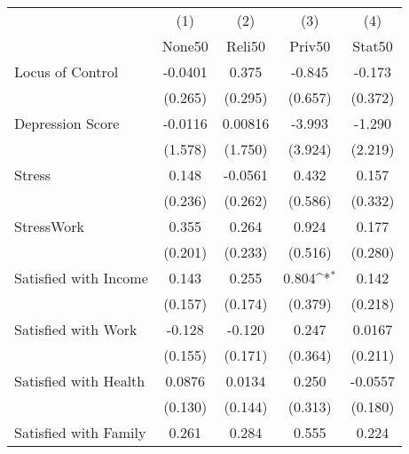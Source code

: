 {
\def\sym#1{\ifmmode^{#1}\else\(^{#1}\)\fi}
\begin{tabular}{l*{4}{c}}
\hline\hline
            &\multicolumn{1}{c}{(1)}&\multicolumn{1}{c}{(2)}&\multicolumn{1}{c}{(3)}&\multicolumn{1}{c}{(4)}\\
            &\multicolumn{1}{c}{None50}&\multicolumn{1}{c}{Reli50}&\multicolumn{1}{c}{Priv50}&\multicolumn{1}{c}{Stat50}\\
\hline
Locus of Control&     -0.0401         &       0.375         &      -0.845         &      -0.173         \\
            &     (0.265)         &     (0.295)         &     (0.657)         &     (0.372)         \\
[1em]
Depression Score&     -0.0116         &     0.00816         &      -3.993         &      -1.290         \\
            &     (1.578)         &     (1.750)         &     (3.924)         &     (2.219)         \\
[1em]
Stress      &       0.148         &     -0.0561         &       0.432         &       0.157         \\
            &     (0.236)         &     (0.262)         &     (0.586)         &     (0.332)         \\
[1em]
StressWork  &       0.355         &       0.264         &       0.924         &       0.177         \\
            &     (0.201)         &     (0.233)         &     (0.516)         &     (0.280)         \\
[1em]
Satisfied with Income&       0.143         &       0.255         &       0.804\sym{*}  &       0.142         \\
            &     (0.157)         &     (0.174)         &     (0.379)         &     (0.218)         \\
[1em]
Satisfied with Work&      -0.128         &      -0.120         &       0.247         &      0.0167         \\
            &     (0.155)         &     (0.171)         &     (0.364)         &     (0.211)         \\
[1em]
Satisfied with Health&      0.0876         &      0.0134         &       0.250         &     -0.0557         \\
            &     (0.130)         &     (0.144)         &     (0.313)         &     (0.180)         \\
[1em]
Satisfied with Family&       0.261         &       0.284         &       0.555         &       0.224         \\

\end{tabular}}
